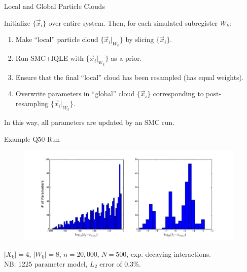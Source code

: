 \documentclass[xcolor=dvipsnames, compress]{beamer}
\newcommand{\ee}{\mathrm{e}}
\begin{document}
\begin{frame}{Local and Global Particle Clouds}

  Initialize $\{\vec{x}_i\}$ over entire system. Then, for each simulated subregister $W_k$:
  \begin{enumerate}
    \item Make ``local'' particle cloud $\{\vec{x}_i|_{W_k}\}$ by slicing $\{\vec{x}_i\}$.
    \item Run SMC+IQLE with $\{\vec{x}_i|_{W_k}\}$ as a prior.
    \item Ensure that the final ``local'' cloud has been resampled (has equal weights).
    \item Overwrite parameters in ``global'' cloud $\{\vec{x}_i\}$ corresponding
      to post-resampling $\{\vec{x}_i|_{W_k}\}$.
  \end{enumerate}

  In this way, all parameters are updated by an SMC run.

\end{frame}


\begin{frame}{Example Q50 Run}

  \begin{figure}
    \centering
    \includegraphics[width=1\textwidth]{8outc2a-hist}
  \end{figure}

  $|X_k| = 4$, $|W_k| = 8$, $n = 20,000$, $N = 500$, exp. decaying interactions.\\
  NB: 1225 parameter model, $L_2$ error of $0.3\%$.

\end{frame}
\end{document}
